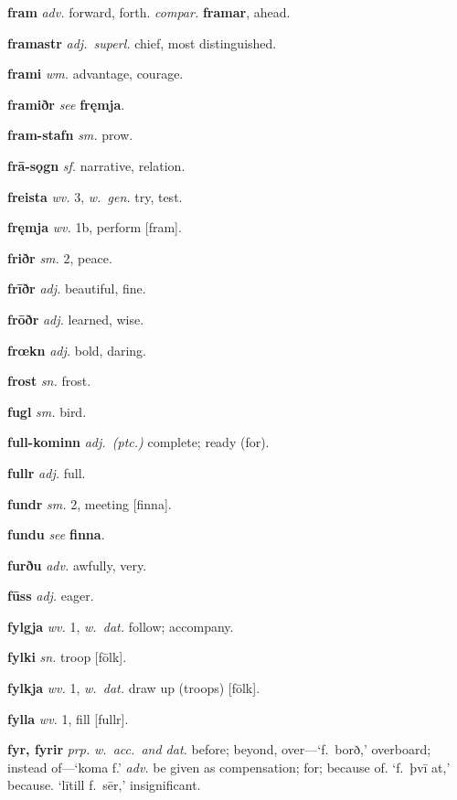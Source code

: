\documentclass[12pt,letterpaper]{book}
\begin{document}
\noindent
\textbf{fram} \textit{adv.} forward, forth.  \textit{compar.} \textbf{framar},
	ahead.

\noindent
\textbf{framastr} \textit{adj.\ superl.} chief, most distinguished.

\noindent
\textbf{frami} \textit{wm.} advantage, courage.

\noindent
\textbf{framiðr} \textit{} \textit{see} \textbf{fręmja}.

\noindent
\textbf{fram-stafn} \textit{sm.} prow.

\noindent
\textbf{frā-sǫgn} \textit{sf.} narrative, relation.

\noindent
\textbf{freista} \textit{wv.} 3, \textit{w.\ gen.} try, test.

\noindent
\textbf{fręmja} \textit{wv.} 1b, perform [fram].

\noindent
\textbf{friðr} \textit{sm.} 2, peace.

\noindent
\textbf{frīðr} \textit{adj.} beautiful, fine.

\noindent
\textbf{frōðr} \textit{adj.} learned, wise.

\noindent
\textbf{frœkn} \textit{adj.} bold, daring.

\noindent
\textbf{frost} \textit{sn.} frost.

\noindent
\textbf{fugl} \textit{sm.} bird.

\noindent
\textbf{full-kominn} \textit{adj.\ (ptc.)} complete; ready (for).

\noindent
\textbf{fullr} \textit{adj.} full.

\noindent
\textbf{fundr} \textit{sm.} 2, meeting [finna].

\noindent
\textbf{fundu} \textit{} \textit{see} \textbf{finna}.

\noindent
\textbf{furðu} \textit{adv.} awfully, very.

\noindent
\textbf{fūss} \textit{adj.} eager.

\noindent
\textbf{fylgja} \textit{wv.} 1, \textit{w.\ dat.} follow; accompany.

\noindent
\textbf{fylki} \textit{sn.} troop [fōlk].

\noindent
\textbf{fylkja} \textit{wv.} 1, \textit{w.\ dat.} draw up (troops) [fōlk].

\noindent
\textbf{fylla} \textit{wv.} 1, fill [fullr].

\noindent
\textbf{fyr, fyrir} \textit{prp.} \textit{w.\ acc.\ and dat.} before; beyond,
	over---`f.\ borð,' overboard; instead of---`koma f.'  \textit{adv.} be
	given as compensation; for; because of.  `f.\ þvī at,' because.
    `lītill f.\ sēr,' insignificant.
\end{document}
